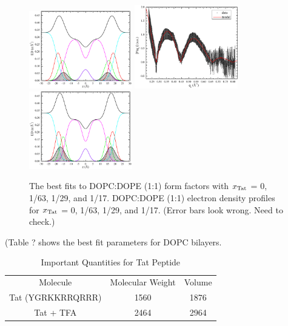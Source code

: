 \begin{figure}[htbp]
  \includegraphics[width=0.4\textwidth]{./figures/Tat/SDP_Results/EDP/DOPCDOPE1to1_Tat_28to1_3p0_EDP1}
  \includegraphics[width=0.4\textwidth]{figures/Tat/SDP_Results/XFF/DOPCDOPE1to1_Tat_16to1_3p0_XFF1}
  \includegraphics[width=0.4\textwidth]{./figures/Tat/SDP_Results/EDP/DOPCDOPE1to1_Tat_16to1_3p0_EDP1}
  \caption{The best fits to DOPC:DOPE (1:1) form factors with 
  $x_\textrm{Tat}$ = 0, 1/63, 1/29, and 1/17.
  DOPC:DOPE (1:1) electron density profiles for $x_\textrm{Tat}$ = 0, 1/63,
  1/29, and 1/17. (Error bars look wrong. Need to check.)}
  \label{fig:DOPCDOPE1to1_Tat_XFF1}
\end{figure}
(Table ? shows the best fit parameters for DOPC bilayers.
\begin{table}[ht]
  \centering
  \begin{tabular}{c c c}
    Molecule & Molecular Weight & Volume \\
    Tat (YGRKKRRQRRR) & 1560 & 1876 \\ 
    Tat + TFA & 2464 & 2964
  \end{tabular}
  \caption{Important Quantities for Tat Peptide}
  \label{tb:Tat}
\end{table}

